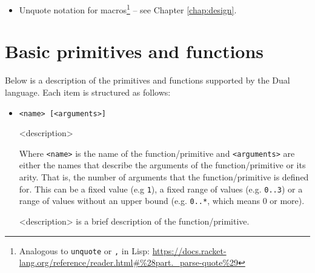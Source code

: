 \begin{itemize}
\begin{lstlisting}
        -- logs `Hello, Bill.` log ['[Hello, {name}.]]
    \end{lstlisting}
    
    As we can see this gives us a very convenient notation for string
    interpolation, similar to e.g. template literals in
    JavaScript\footnote{\url{https://developer.mozilla.org/en-US/docs/Web/JavaScript/Reference/Template_literals}}.
    In order to escape curly braces, they should be doubled:
    \begin{lstlisting}
        -- logs `Hello, {name}.` log ['[Hello, {{name}}.]]
    \end{lstlisting}
    
    I also added a special type of string -- an HTML string, where interpolation
    notation is the other way around -- double braces cause substitution, single
    braces do nothing:
    \begin{lstlisting}
        bind [name '|Bill] -- logs `<h1>Hello, Bill.</h1>` log [html'[<h1>Hello,
            {{name}}.</h1>]]
        
        -- logs `<h1>Hello, {name}.</h1>` log [html'[<h1>Hello, {name}.</h1>]]
    \end{lstlisting}
    
    This is to enable embedding CSS and JavaScript code inside those strings,
    without having to constantly escape brace characters.
    
    \item Unquote notation for macros\footnote{Analogous to \texttt{unquote} or
      \texttt{,} in Lisp:
      \url{https://docs.racket-lang.org/reference/reader.html\#\%28part._parse-quote\%29}}
      -- see Chapter \ref{chap:design}.
\end{itemize}

\section{Basic primitives and functions}\label{sec:primitives}
Below is a description of the primitives and functions supported by the Dual
language. Each item is structured as follows:
\begin{itemize}
    \item \texttt{<name> [<arguments>]}
    
    <description>
    
    Where \texttt{<name>} is the name of the function/primitive and
    \texttt{<arguments>} are either the names that describe the arguments of the
    function/primitive or its arity. That is, the number of arguments that the
    function/primitive is defined for. This can be a fixed value (e.g
    \texttt{1}), a fixed range of values (e.g. \texttt{0..3}) or a range of
    values without an upper bound (e.g. \texttt{0..*}, which means 0 or more).
    
    <description> is a brief description of the function/primitive.
\end{itemize}

